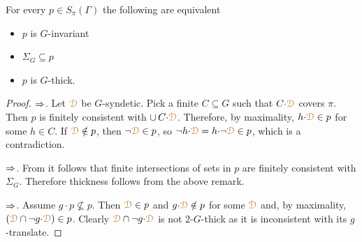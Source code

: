 
\begin{theorem}\label{thm_syndetic_invariant}
  For every $p\in S_\pi(\Gamma)$ the following are equivalent
  \begin{itemize}
    \item[1.] $p$ is $G$-invariant
    \item[2.] $\Sigma_G\subseteq p$
    \item[3.] $p$ is $G$-thick.\smallskip
  \end{itemize}
\end{theorem}

\begin{proof}
  $\Rightarrow$.
  Let ${\color{brown}\EuScript D}$ be $G$-syndetic.
  Pick a finite $C\subseteq G$ such that $C{\cdot}{\color{brown}\EuScript D}$ covers $\pi$.
  Then $p$ is finitely consistent with $\cup\,C{\cdot}{\color{brown}\EuScript D}$.
  Therefore, by maximality, $h{\cdot}{\color{brown}\EuScript D}\in p$ for some $h\in C$.
  If ${\color{brown}\EuScript D}\notin p$, then $\neg{\color{brown}\EuScript D}\in p$, so $\neg h{\cdot}{\color{brown}\EuScript D}=h{\cdot}\neg{\color{brown}\EuScript D}\in p$, which is a contradiction.
  
  $\Rightarrow$.
  From  it follows that finite intersections of sets in $p$ are finitely consistent with $\Sigma_G$.
  Therefore thickness follows from the above remark.

  $\Rightarrow$.
  Assume $g{\cdot}p\nsubseteq p$.
  Then ${\color{brown}\EuScript D}\in p$ and $g{\cdot}{\color{brown}\EuScript D}\notin p$ for some ${\color{brown}\EuScript D}$ and, by maximality, $({\color{brown}\EuScript D}\cap\neg g{\cdot}{\color{brown}\EuScript D})\in p$.
  Clearly ${\color{brown}\EuScript D}\cap \neg g{\cdot}{\color{brown}\EuScript D}$ is not $2$-$G$-thick as it is inconsistent with its $g$-translate.
\end{proof}


